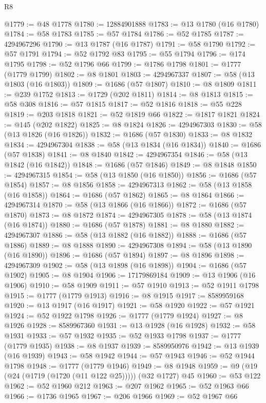 \begin{lexlean}{R8}
\begin{coremodule}
@1779 := @48 @1778
@1780 := 12884901888
@1783 := @13 @1780 (@16 @1780)
@1784 := @58 @1783
@1785 := @57 @1784
@1786 := @52 @1785
@1787 := 4294967296
@1790 := @13 @1787 (@16 @1787)
@1791 := @58 @1790
@1792 := @57 @1791
@1794 := @52 @1792 @83
@1795 := @55 @1794
@1796 := @174 @1795
@1798 := @52 @1796 @66
@1799 := @1786 @1798
@1801 := @1777 (@1779 @1799)
@1802 := @8 @1801
@1803 := 4294967337
@1807 := @58 (@13 @1803 (@16 @1803))
@1809 := @1686 (@57 @1807)
@1810 := @8 @1809
@1811 := @239 @1752
@1813 := @1729 (@202 @1811)
@1814 := @8 @1813
@1815 := @58 @308
@1816 := @57 @1815
@1817 := @52 @1816
@1818 := @55 @228
@1819 := @203 @1818
@1821 := @52 @1819 @66
@1822 := @1817 @1821
@1824 := @145 (@202 @1822)
@1825 := @8 @1824
@1826 := 4294967303
@1830 := @58 (@13 @1826 (@16 @1826))
@1832 := @1686 (@57 @1830)
@1833 := @8 @1832
@1834 := 4294967304
@1838 := @58 (@13 @1834 (@16 @1834))
@1840 := @1686 (@57 @1838)
@1841 := @8 @1840
@1842 := 4294967354
@1846 := @58 (@13 @1842 (@16 @1842))
@1848 := @1686 (@57 @1846)
@1849 := @8 @1848
@1850 := 4294967315
@1854 := @58 (@13 @1850 (@16 @1850))
@1856 := @1686 (@57 @1854)
@1857 := @8 @1856
@1858 := 4294967313
@1862 := @58 (@13 @1858 (@16 @1858))
@1864 := @1686 (@57 @1862)
@1865 := @8 @1864
@1866 := 4294967314
@1870 := @58 (@13 @1866 (@16 @1866))
@1872 := @1686 (@57 @1870)
@1873 := @8 @1872
@1874 := 4294967305
@1878 := @58 (@13 @1874 (@16 @1874))
@1880 := @1686 (@57 @1878)
@1881 := @8 @1880
@1882 := 4294967307
@1886 := @58 (@13 @1882 (@16 @1882))
@1888 := @1686 (@57 @1886)
@1889 := @8 @1888
@1890 := 4294967308
@1894 := @58 (@13 @1890 (@16 @1890))
@1896 := @1686 (@57 @1894)
@1897 := @8 @1896
@1898 := 4294967309
@1902 := @58 (@13 @1898 (@16 @1898))
@1904 := @1686 (@57 @1902)
@1905 := @8 @1904
@1906 := 17179869184
@1909 := @13 @1906 (@16 @1906)
@1910 := @58 @1909
@1911 := @57 @1910
@1913 := @52 @1911 @1798
@1915 := @1777 (@1779 @1913)
@1916 := @8 @1915
@1917 := 8589959168
@1920 := @13 @1917 (@16 @1917)
@1921 := @58 @1920
@1922 := @57 @1921
@1924 := @52 @1922 @1798
@1926 := @1777 (@1779 @1924)
@1927 := @8 @1926
@1928 := 8589967360
@1931 := @13 @1928 (@16 @1928)
@1932 := @58 @1931
@1933 := @57 @1932
@1935 := @52 @1933 @1798
@1937 := @1777 (@1779 @1935)
@1938 := @8 @1937
@1939 := 8589950976
@1942 := @13 @1939 (@16 @1939)
@1943 := @58 @1942
@1944 := @57 @1943
@1946 := @52 @1944 @1798
@1948 := @1777 (@1779 @1946)
@1949 := @8 @1948
@1959 := @9 (@19 (@24 (@1719 (@1720 (@11 @122 @25))))) (@32 @1727) @45
@1960 := @53 @122
@1962 := @52 @1960 @212
@1963 := @207 @1962
@1965 := @52 @1963 @66
@1966 := @1736 @1965
@1967 := @206 @1966
@1969 := @52 @1967 @66

\end{coremodule}
\end{lexlean}
